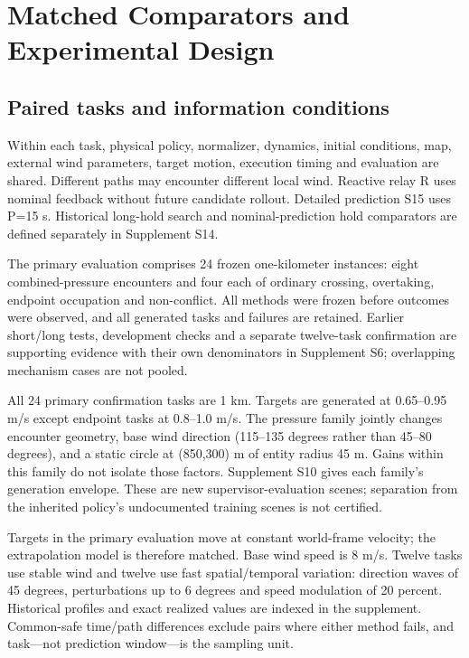 \documentclass[conference]{IEEEtran}
\begin{document}
\section{Matched Comparators and Experimental Design}

\subsection{Paired tasks and information conditions}

Within each task, physical policy, normalizer, dynamics, initial conditions, map, external wind parameters, target motion, execution timing and evaluation are shared. Different paths may encounter different local wind. Reactive relay R uses nominal feedback without future candidate rollout. Detailed prediction S15 uses P=15 s. Historical long-hold search and nominal-prediction hold comparators are defined separately in Supplement S14.

The primary evaluation comprises 24 frozen one-kilometer instances: eight combined-pressure encounters and four each of ordinary crossing, overtaking, endpoint occupation and non-conflict. All methods were frozen before outcomes were observed, and all generated tasks and failures are retained. Earlier short/long tests, development checks and a separate twelve-task confirmation are supporting evidence with their own denominators in Supplement S6; overlapping mechanism cases are not pooled.

All 24 primary confirmation tasks are 1 km. Targets are generated at 0.65--0.95 m/s except endpoint tasks at 0.8--1.0 m/s. The pressure family jointly changes encounter geometry, base wind direction (115--135 degrees rather than 45--80 degrees), and a static circle at (850,300) m of entity radius 45 m. Gains within this family do not isolate those factors. Supplement S10 gives each family's generation envelope. These are new supervisor-evaluation scenes; separation from the inherited policy's undocumented training scenes is not certified.

Targets in the primary evaluation move at constant world-frame velocity; the extrapolation model is therefore matched. Base wind speed is 8 m/s. Twelve tasks use stable wind and twelve use fast spatial/temporal variation: direction waves of 45 degrees, perturbations up to 6 degrees and speed modulation of 20 percent. Historical profiles and exact realized values are indexed in the supplement. Common-safe time/path differences exclude pairs where either method fails, and task---not prediction window---is the sampling unit.
\end{document}
